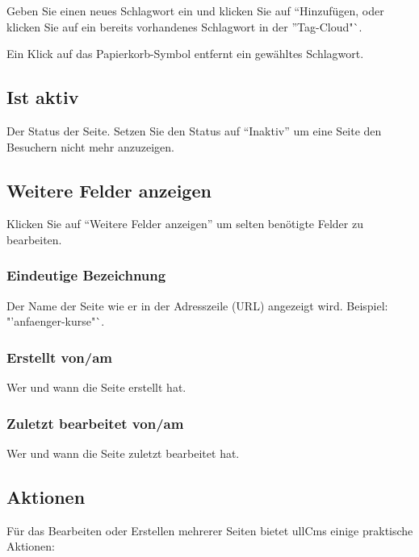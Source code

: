 \documentclass[article, a4paper, oneside, 11pt]{memoir}
\begin{document}
Geben Sie einen neues Schlagwort ein und klicken Sie auf "`Hinzufügen, oder klicken Sie auf ein bereits vorhandenes Schlagwort in der "'Tag-Cloud"`.

Ein Klick auf das Papierkorb-Symbol entfernt ein gewähltes Schlagwort.

\subsection{Ist aktiv}

Der Status der Seite. Setzen Sie den Status auf "`Inaktiv"' um eine Seite den Besuchern nicht mehr anzuzeigen.




\subsection{Weitere Felder anzeigen}

Klicken Sie auf "`Weitere Felder anzeigen"' um selten benötigte Felder zu bearbeiten.

\subsubsection{Eindeutige Bezeichnung}

Der Name der Seite wie er in der Adresszeile (URL) angezeigt wird. Beispiel: "'anfaenger-kurse"`.

\subsubsection{Erstellt von/am}

Wer und wann die Seite erstellt hat.

\subsubsection{Zuletzt bearbeitet von/am}

Wer und wann die Seite zuletzt bearbeitet hat.



\subsection{Aktionen}

Für das Bearbeiten oder Erstellen mehrerer Seiten bietet ullCms einige praktische Aktionen:
\end{document}
